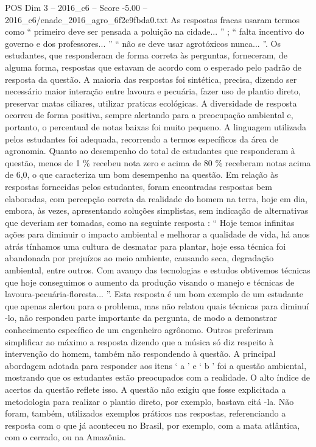 \begin{textsample}{POS Dim 3 – 2016\_c6 – Score -5.00 – 2016\_c6/enade\_2016\_agro\_6f2e9fbda0.txt}
As respostas fracas usaram termos como “ primeiro deve ser pensada a poluição na cidade... ” ; “ falta incentivo do governo e dos professores... ” “ não se deve usar agrotóxicos nunca... ”.
Os estudantes, que responderam de forma correta às perguntas, forneceram, de alguma forma, respostas que estavam de acordo com o esperado pelo padrão de resposta da questão.
A maioria das respostas foi sintética, precisa, dizendo ser necessário maior interação entre lavoura e pecuária, fazer uso de plantio direto, preservar matas ciliares, utilizar praticas ecológicas.
A diversidade de resposta ocorreu de forma positiva, sempre alertando para a preocupação ambiental e, portanto, o percentual de notas baixas foi muito pequeno.
A linguagem utilizada pelos estudantes foi adequada, recorrendo a termos específicos da área de agronomia.
Quanto ao desempenho do total de estudantes que responderam à questão, menos de 1 \% recebeu nota zero e acima de 80 \% receberam notas acima de 6,0, o que caracteriza um bom desempenho na questão.
Em relação às respostas fornecidas pelos estudantes, foram encontradas respostas bem elaboradas, com percepção correta da realidade do homem na terra, hoje em dia, embora, às vezes, apresentando soluções simplistas, sem indicação de alternativas que deveriam ser tomadas, como na seguinte resposta : “ Hoje temos infinitas ações para diminuir o impacto ambiental e melhorar a qualidade de vida, há anos atrás tínhamos uma cultura de desmatar para plantar, hoje essa técnica foi abandonada por prejuízos ao meio ambiente, causando seca, degradação ambiental, entre outros.
Com avanço das tecnologias e estudos obtivemos técnicas que hoje conseguimos o aumento da produção visando o manejo e técnicas de lavoura-pecuária-floresta... ”.
Esta resposta é um bom exemplo de um estudante que apenas alertou para o problema, mas não relatou quais técnicas para diminuí -lo, não respondeu parte importante da pergunta, de modo a demonstrar conhecimento específico de um engenheiro agrônomo.
Outros preferiram simplificar ao máximo a resposta dizendo que a música só diz respeito à intervenção do homem, também não respondendo à questão.
A principal abordagem adotada para responder aos itens ‘ a ’ e ‘ b ’ foi a questão ambiental, mostrando que os estudantes estão preocupados com a realidade.
O alto índice de acertos da questão reflete isso.
A questão não exigiu que fosse explicitada a metodologia para realizar o plantio direto, por exemplo, bastava citá -la.
Não foram, também, utilizados exemplos práticos nas respostas, referenciando a resposta com o que já aconteceu no Brasil, por exemplo, com a mata atlântica, com o cerrado, ou na Amazônia.

\end{textsample}
